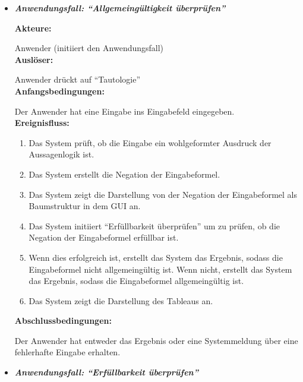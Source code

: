 \begin{itemize}


\item \textit{\textbf{Anwendungsfall: ``Allgemeingültigkeit überprüfen''}}

\textbf{Akteure:}

Anwender (initiiert den Anwendungsfall)\\

\textbf{Auslöser:}

Anwender drückt auf ``Tautologie''\\

\textbf{Anfangsbedingungen:}

Der Anwender hat eine Eingabe ins Eingabefeld eingegeben.\\

\textbf{Ereignisfluss:}
\begin{enumerate}
\item Das System prüft, ob die Eingabe ein wohlgeformter Ausdruck der Aussagenlogik ist. 
\item Das System erstellt die Negation der Eingabeformel.
\item Das System zeigt die Darstellung von der Negation der Eingabeformel als Baumstruktur in dem GUI an.
\item Das System initiiert ``Erfüllbarkeit überprüfen'' um zu prüfen, ob die Negation der Eingabeformel erfüllbar ist.
\item Wenn dies erfolgreich ist, erstellt das System das Ergebnis, sodass die Eingabeformel nicht allgemeingültig ist. Wenn nicht, erstellt das System das Ergebnis, sodass die Eingabeformel allgemeingültig ist.
\item Das System zeigt die Darstellung des Tableaus an.
\end{enumerate}

\textbf{Abschlussbedingungen:}

Der Anwender hat entweder das Ergebnis oder eine Systemmeldung über eine fehlerhafte Eingabe erhalten.\\
	
\item \textit{\textbf{Anwendungsfall: ``Erfüllbarkeit überprüfen''}}


\end{itemize}

